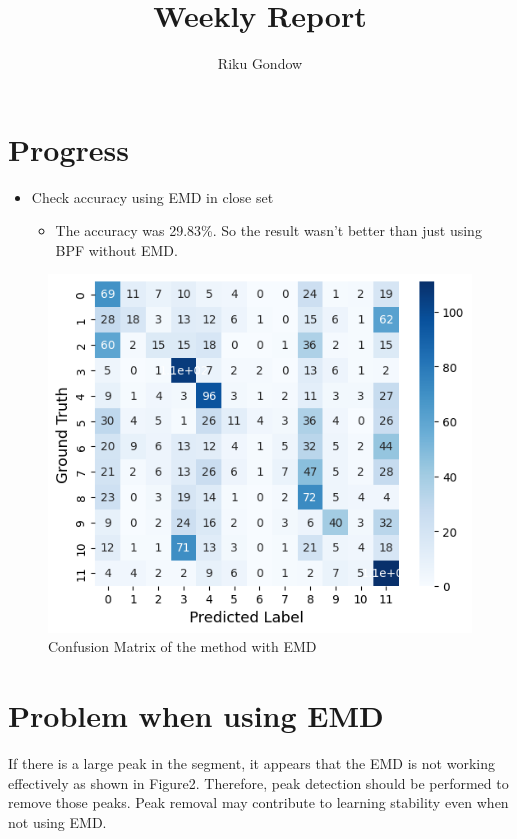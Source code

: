 \documentclass[dvipdfmx]{article}
\begin{document}
\title{Weekly Report}
\author{Riku Gondow}
\maketitle
\section{Progress}
\begin{itemize}
    \item Check accuracy using EMD in close set 
    \begin{itemize}
        \item The accuracy was 29.83\%. So the result wasn't better than just using BPF without EMD.
    \end{itemize} 
\end{itemize}

\begin{figure}[H]
\begin{center}
\includegraphics[width=0.7\linewidth]{./img/conf_emd.png}
\end{center}
\caption{Confusion Matrix of the method with EMD}
\end{figure}

\section{Problem when using EMD}
If there is a large peak in the segment, it appears that the EMD is not working effectively as shown in Figure2. Therefore, peak detection should be performed to remove those peaks. Peak removal may contribute to learning stability even when not using EMD.
\end{document}

